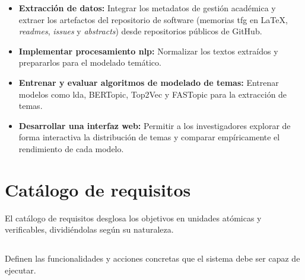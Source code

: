 \begin{itemize}
	\item \textbf{Extracción de datos:} Integrar los metadatos de gestión académica y extraer los artefactos del repositorio de software (memorias \acrshort{tfg} en \LaTeX{}, \textit{readmes}, \textit{issues} y \textit{abstracts}) desde repositorios públicos de GitHub.
	\item \textbf{Implementar procesamiento \acrshort{nlp}:} Normalizar los textos extraídos y prepararlos para el modelado temático.
	\item \textbf{Entrenar y evaluar algoritmos de modelado de temas:} Entrenar modelos como \acrshort{lda}, BERTopic, Top2Vec y FASTopic para la extracción de temas.
	\item \textbf{Desarrollar una interfaz web:} Permitir a los investigadores explorar de forma interactiva la distribución de temas y comparar empíricamente el rendimiento de cada modelo.
\end{itemize}

\section{Catálogo de requisitos}
El catálogo de requisitos desglosa los objetivos en unidades atómicas y
verificables, dividiéndolas según su naturaleza.

\subsection{}
Definen las funcionalidades y acciones concretas que el sistema debe ser capaz
de ejecutar.

